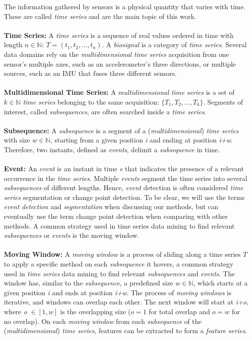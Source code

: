 The information gathered by sensors is a physical quantity that varies with time. These are called \textit{time series} and are the main topic of this work.\\\\
\textbf{Time Series:} A \textit{time series} is a sequence of real values ordered in time with length $n \in \mathbb{N}$: $T = (t_1, t_2, ..., t_n)$. A \textit{biosignal} is a category of \textit{time series}.
Several data domains rely on the \textit{multidimensional time series} acquisition from one sensor's multiple axes, such as an accelerometer's three directions, or multiple sources, such as an IMU that fuses three different sensors.\\\\
\textbf{Multidimensional Time Series:} A \textit{multidimensional time series} is a set of $k \in \mathbb{N}$ \textit{time series} belonging to the same acquisition: $\{T_1, T_2, ..., T_k\}$. Segments of interest, called \textit{subsequences}, are often searched inside a \textit{time series}.\\\\
\textbf{Subsequence:} A \textit{subsequence} is a segment of a (\textit{multidimensional}) \textit{time series} with size $w \in \mathbb{N}$, starting from a given position \textit{i} and ending at position \textit{i+w}. Therefore, two instants, defined as \textit{events}, delimit a \textit{subsequence} in time.\\\\
\textbf{Event:} An \textit{event} is an instant in time \textit{e} that indicates the presence of a relevant occurrence in the \textit{time series}. Multiple \textit{events} segment the time series into several \textit{subsequences} of different lengths. Hence, \textit{event} detection is often considered \textit{time series} segmentation or change point detection\cite{cpd_alan}. To be clear, we will use the terms \textit{event detection} and \textit{segmentation} when discussing our methods, but can eventually use the term change point detection when comparing with other methods. A common strategy used in time series data mining to find relevant \textit{subsequences} or \textit{events} is  the moving window.\\\\
\textbf{Moving Window:} A \textit{moving window} is a process of sliding along a time series $T$ to apply a specific method on each \textit{subsequence} it hovers, a common strategy used in \textit{time series} data mining to find relevant \textit{subsequences} and \textit{events}.
The window has, similar to the \textit{subsequence}, a predefined size $w \in \mathbb{N}$, which starts at a given position \textit{i} and ends at position \textit{i+w}.
The process of \textit{moving windows} is iterative, and windows can overlap each other. The next window will start at \textit{i+o}, where  \textit{o} $\in [1, w]$ is the overlapping size ($o=1$ for total overlap and $o=w$ for no overlap).
On each \textit{moving window} from each \textit{subsequence} of the (\textit{multidimensional}) \textit{time series}, features can be extracted to form a \textit{feature series}.

